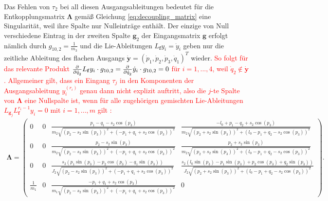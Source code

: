 Das Fehlen von $\tau_2$ bei all diesen Ausgangsableitungen bedeutet für die Entkopplungsmatrix $\boldsymbol{\Lambda}$ gemäß Gleichung \eqref{eq:decoupling_matrix} eine Singularität, weil ihre Spalte nur Nulleinträge enthält. Der einzige von Null verschiedene Eintrag in der zweiten Spalte $\mathbf{g}_2$ der Eingangsmatrix $\mathbf{g}$ erfolgt nämlich durch $g_{10, 2} = \frac{1}{m_3}$ und die Lie-Ableitungen $L_{\mathbf{f}} y_i = \dot{y}_i$ geben nur die zeitliche Ableitung des flachen Ausgangs $\dot{\mathbf{y}} = (\dot{p}_1, \dot{p}_2, \dot{p}_3, \dot{q}_1)^T$ wieder. \textcolor{red}{So folgt für das relevante Produkt $\frac{\partial^{}}{\partial{\dot{q}_2}^{}} L_{\mathbf{f}} y_i \cdot g_{10, 2} = \frac{\partial^{}}{\partial{\dot{q}_2}^{}} \dot{y}_i \cdot g_{10, 2} = 0$ für $i = 1,..., 4$, weil $\dot{q}_2 \not\in \dot{\mathbf{y}}$. Allgemeiner gilt, dass ein Eingang $\tau_j$ in den Komponenten der Ausgangsableitung $y_i^{(r_i)}$ genau dann nicht explizit auftritt, also die $j$-te Spalte von $\boldsymbol{\Lambda}$ eine Nullspalte ist, wenn für alle zugehörigen gemischten Lie-Ableitungen $L_{\mathbf{g}_j} L_{\mathbf{f}}^{r_i-1} y_i = 0$ mit $i = 1, ..., m$ gilt \cite[S. 201]{NLRT_Roebenack}:}
\begin{align}
	\boldsymbol{\Lambda} = 
	\left(\begin{smallmatrix}
		0 & 0 & \frac{p_{1} - q_{1} - s_{2} \cos{\left(p_{3} \right)}}{m_{2} \sqrt{\left(p_{2} - s_{2} \sin{\left(p_{3} \right)}\right)^{2} + \left(- p_{1} + q_{1} + s_{2} \cos{\left(p_{3} \right)}\right)^{2}}} & \frac{- l_{0} + p_{1} - q_{2} + s_{2} \cos{\left(p_{3} \right)}}{m_{2} \sqrt{\left(p_{2} + s_{2} \sin{\left(p_{3} \right)}\right)^{2} + \left(l_{0} - p_{1} + q_{2} - s_{2} \cos{\left(p_{3} \right)}\right)^{2}}}\\
		0 & 0 & \frac{p_{2} - s_{2} \sin{\left(p_{3} \right)}}{m_{2} \sqrt{\left(p_{2} - s_{2} \sin{\left(p_{3} \right)}\right)^{2} + \left(- p_{1} + q_{1} + s_{2} \cos{\left(p_{3} \right)}\right)^{2}}} & \frac{p_{2} + s_{2} \sin{\left(p_{3} \right)}}{m_{2} \sqrt{\left(p_{2} + s_{2} \sin{\left(p_{3} \right)}\right)^{2} + \left(l_{0} - p_{1} + q_{2} - s_{2} \cos{\left(p_{3} \right)}\right)^{2}}}\\
		0 & 0 & \frac{s_{2} \left(p_{1} \sin{\left(p_{3} \right)} - p_{2} \cos{\left(p_{3} \right)} - q_{1} \sin{\left(p_{3} \right)}\right)}{J_{2} \sqrt{\left(p_{2} - s_{2} \sin{\left(p_{3} \right)}\right)^{2} + \left(- p_{1} + q_{1} + s_{2} \cos{\left(p_{3} \right)}\right)^{2}}} & \frac{s_{2} \left(l_{0} \sin{\left(p_{3} \right)} - p_{1} \sin{\left(p_{3} \right)} + p_{2} \cos{\left(p_{3} \right)} + q_{2} \sin{\left(p_{3} \right)}\right)}{J_{2} \sqrt{\left(p_{2} + s_{2} \sin{\left(p_{3} \right)}\right)^{2} + \left(l_{0} - p_{1} + q_{2} - s_{2} \cos{\left(p_{3} \right)}\right)^{2}}}\\
		\frac{1}{m_{1}} & 0 & \frac{- p_{1} + q_{1} + s_{2} \cos{\left(p_{3} \right)}}{m_{1} \sqrt{\left(p_{2} - s_{2} \sin{\left(p_{3} \right)}\right)^{2} + \left(- p_{1} + q_{1} + s_{2} \cos{\left(p_{3} \right)}\right)^{2}}} & 0
	\end{smallmatrix}\right) .
\end{align}


